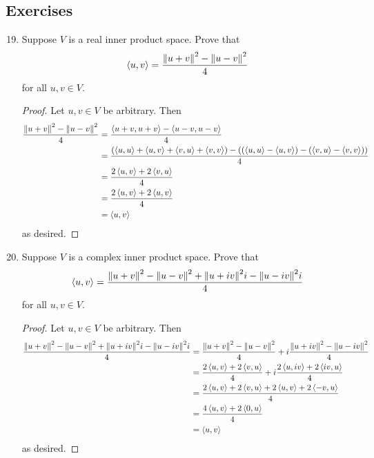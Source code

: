 \documentclass[../main.tex]{subfiles}
\begin{document}
\subsection*{Exercises}
\begin{enumerate}[label={\textbf{\arabic*}},labelsep=1em,ref={\thesection.\arabic*}]
    \setcounter{enumi}{18}
    \item {}\label{exr:6A19}Suppose $V$ is a real inner product space. Prove that
    \begin{equation*}
        \left\langle{u},{v}\right\rangle = \frac{\norm{u+v}^2-\norm{u-v}^2}{4}
    \end{equation*}
    for all $u,v\in V$.
    \begin{proof}
        Let $u,v\in V$ be arbitrary. Then
        \begin{align*}
            \frac{\norm{u+v}^2-\norm{u-v}^2}{4} &= \frac{\left\langle{u+v},{u+v}\right\rangle-\left\langle{u-v},{u-v}\right\rangle}{4}\\
            &= \frac{(\left\langle{u},{u}\right\rangle+\left\langle{u},{v}\right\rangle+\left\langle{v},{u}\right\rangle+\left\langle{v},{v}\right\rangle)-((\left\langle{u},{u}\right\rangle-\left\langle{u},{v}\right\rangle)-(\left\langle{v},{u}\right\rangle-\left\langle{v},{v}\right\rangle))}{4}\\
            &= \frac{2\left\langle{u},{v}\right\rangle+2\left\langle{v},{u}\right\rangle}{4}\\
            &= \frac{2\left\langle{u},{v}\right\rangle+2\left\langle{u},{v}\right\rangle}{4}\\
            &= \left\langle{u},{v}\right\rangle
        \end{align*}
        as desired.
    \end{proof}
    \item \label{exr:6A20}Suppose $V$ is a complex inner product space. Prove that
    \begin{equation*}
        \left\langle{u},{v}\right\rangle = \frac{\norm{u+v}^2-\norm{u-v}^2+\norm{u+iv}^2i-\norm{u-iv}^2i}{4}
    \end{equation*}
    for all $u,v\in V$.
    \begin{proof}
        Let $u,v\in V$ be arbitrary. Then
        \begin{align*}
            \frac{\norm{u+v}^2-\norm{u-v}^2+\norm{u+iv}^2i-\norm{u-iv}^2i}{4} &= \frac{\norm{u+v}^2-\norm{u-v}^2}{4}+i\frac{\norm{u+iv}^2-\norm{u-iv}^2}{4}\\
            &= \frac{2\left\langle{u},{v}\right\rangle+2\left\langle{v},{u}\right\rangle}{4}+i\frac{2\left\langle{u},{iv}\right\rangle+2\left\langle{iv},{u}\right\rangle}{4}\\
            &= \frac{2\left\langle{u},{v}\right\rangle+2\left\langle{v},{u}\right\rangle+2\left\langle{u},{v}\right\rangle+2\left\langle{-v},{u}\right\rangle}{4}\\
            &= \frac{4\left\langle{u},{v}\right\rangle+2\left\langle{0},{u}\right\rangle}{4}\\
            &= \left\langle{u},{v}\right\rangle
        \end{align*}
        as desired.
    \end{proof}
\end{enumerate}
\end{document}
